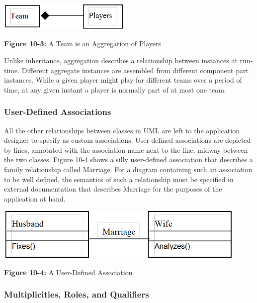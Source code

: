 \begin{center}
\includegraphics[width=2.52in,height=0.54in]{ub-img/aggregat.png} 

{\sffamily\bfseries Figure 10-3:}
{\sffamily A Team is an Aggregation of Players}
\end{center}

Unlike inheritance, aggregation describes a relationship between
instances at run-time. Different aggregate instances are assembled from
different component part instances. While a given player might play for
different teams over a period of time, at any given instant a player is
normally part of at most one team.

\subsubsection{User-Defined Associations}

All the other relationships between classes in UML are left
to the application designer to specify as custom associations.
User-defined associations are depicted by lines, annotated with the
association name next to the line, midway between the two classes.
Figure 10-4 shows a silly user-defined association that describes a
family relationship called Marriage. For a diagram containing such an
association to be well defined, the semantics of such a relationship
must be specified in external documentation that describes Marriage for
the purposes of the application at hand.

\begin{center}
\includegraphics[width=4.8in,height=1.0in]{ub-img/marriage.png} 

{\sffamily\bfseries Figure 10-4:}
{\sffamily A User-Defined Association}
\end{center}

\subsubsection{Multiplicities, Roles, and Qualifiers}

